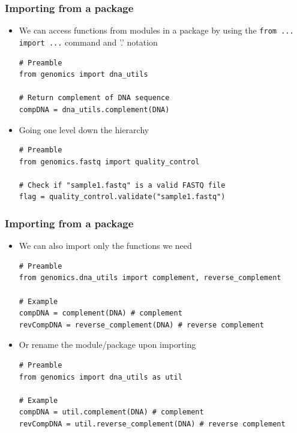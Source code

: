 \documentclass[xcolor=table]{beamer}
\begin{document}
\begin{frame}[fragile]
\frametitle{Importing from a package}

\begin{itemize}

\item<1-> We can access functions from modules in a package by using the  
\texttt{from ... import ...} command and '.' notation
\begin{lstlisting}[style=python]
# Preamble
from genomics import dna_utils

# Return complement of DNA sequence
compDNA = dna_utils.complement(DNA)
\end{lstlisting}

\item<2-> Going one level down the hierarchy
\begin{lstlisting}[style=python]
# Preamble
from genomics.fastq import quality_control

# Check if "sample1.fastq" is a valid FASTQ file
flag = quality_control.validate("sample1.fastq")
\end{lstlisting}

\end{itemize}

\end{frame}

\begin{frame}[fragile]
\frametitle{Importing from a package}

\begin{itemize}

\item<1-> We can also import only the functions we need
\begin{lstlisting}[style=python]
# Preamble
from genomics.dna_utils import complement, reverse_complement

# Example
compDNA = complement(DNA) # complement
revCompDNA = reverse_complement(DNA) # reverse complement
\end{lstlisting}

\item<2-> Or rename the module/package upon importing
\begin{lstlisting}[style=python]
# Preamble
from genomics import dna_utils as util

# Example
compDNA = util.complement(DNA) # complement
revCompDNA = util.reverse_complement(DNA) # reverse complement
\end{lstlisting}

\end{itemize}

\end{frame}
\end{document}
